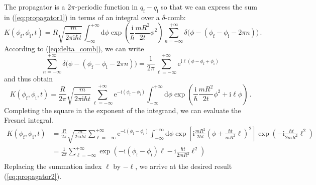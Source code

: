 \documentclass[11pt,DIV=19,parskip=half]{scrartcl}
\begin{document}
The propagator is a $2\pi$-periodic function in $q_\text{f}-q_\text{i}$ so that we can
express the sum in (\ref{eq:propagator1}) in terms of an integral over a $\delta$-comb:
\begin{equation}
 K(\phi_\text{f}, \phi_\text{i}, t) = R\sqrt{\frac{m}{2\pi\text{i}\hbar t}}
   \int_{-\infty}^{+\infty}\!\!\text{d}\phi\exp\!\left(\frac{\text{i}}{\hbar}\frac{mR^2}{2t}\phi^2\right)
   \sum_{n=-\infty}^{+\infty}\delta\big(\phi-(\phi_\text{f}-\phi_\text{i}-2\pi n)\big)\,.
\end{equation}
According to (\ref{eq:delta_comb}), we can write
\begin{equation}
 \sum_{n=-\infty}^{+\infty}\delta\big(\phi-(\phi_\text{f}-\phi_\text{i}-2\pi n)\big) =
   \frac{1}{2\pi}\sum_{\ell=-\infty}^{+\infty}\text{e}^{\text{i}\ell(\phi-\phi_\text{f}+\phi_\text{i})}
\end{equation}
and thus obtain
\begin{equation}
 K(\phi_\text{f}, \phi_\text{i}, t) = \frac{R}{2\pi}\sqrt{\frac{m}{2\pi\text{i}\hbar t}}
  \sum_{\ell=-\infty}^{+\infty}\text{e}^{-\text{i}(\phi_\text{f}-\phi_\text{i})}
  \int_{-\infty}^{+\infty}\!\!\text{d}\phi\exp\!\left(\frac{\text{i}}{\hbar}\frac{mR^2}{2t}\phi^2
	                  +\text{i}\ell\phi\right)\,.
\end{equation}
Completing the square in the exponent of the integrand, we can evaluate the Fresnel integral.
\begin{equation}
 \begin{aligned}
  K(\phi_\text{f}, \phi_\text{i}, t) &= \frac{R}{2\pi}\sqrt{\frac{m}{2\pi\text{i}\hbar t}}
  \sum_{\ell=-\infty}^{+\infty}\text{e}^{-\text{i}(\phi_\text{f}-\phi_\text{i})}
	 \int_{-\infty}^{+\infty}\!\!\text{d}\phi\exp\!\left[\text{i}\frac{mR^2}{2\hbar t}
			\left(\phi+\frac{\hbar t}{mR^2}\ell\right)^2\right]
			\exp\left(-\text{i}\frac{\hbar t}{2mR^2}\ell^2\right)\\
   &= \frac{1}{2\pi}\sum_{\ell=-\infty}^{+\infty}\exp\left(-\text{i}(\phi_\text{f}-\phi_\text{i})\ell
			-\text{i}\frac{\hbar t}{2mR^2}\ell^2\right)\\
 \end{aligned}
\end{equation}
Replacing the summation index $\ell$ by $-\ell$, we arrive at the desired result (\ref{eq:propagator2}).
\end{document}
